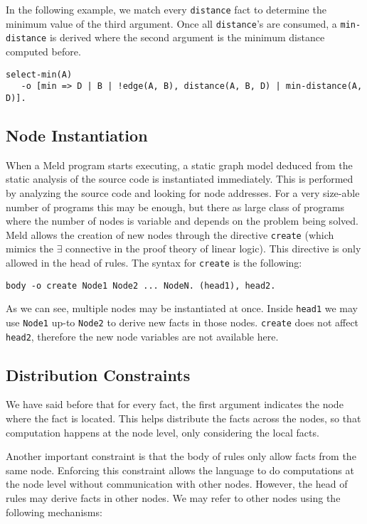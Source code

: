 \documentclass[11pt]{article}
\begin{document}
In the following example, we match every \texttt{distance} fact to determine the minimum value of the third argument. Once all \texttt{distance}'s are consumed, a \texttt{min-distance} is derived where the second argument is the minimum distance computed before.

\begin{verbatim}
select-min(A)
   -o [min => D | B | !edge(A, B), distance(A, B, D) | min-distance(A, D)].
\end{verbatim}

\subsection{Node Instantiation}

When a Meld program starts executing, a static graph model deduced from the static analysis of the source code is instantiated immediately. This is performed by analyzing the source code and looking for node addresses. For a very size-able number of programs this may be enough, but there as large class of programs where the number of nodes is variable and depends on the problem being solved. Meld allows the creation of new nodes through the directive \texttt{create} (which mimics the $\exists$ connective in the proof theory of linear logic). This directive is only allowed in the head of rules. The syntax for \texttt{create} is the following:

\begin{verbatim}
body -o create Node1 Node2 ... NodeN. (head1), head2.
\end{verbatim}

As we can see, multiple nodes may be instantiated at once. Inside \texttt{head1} we may use \texttt{Node1} up-to \texttt{Node2} to derive new facts in those nodes. \texttt{create} does not affect \texttt{head2}, therefore the new node variables are not available here.

\subsection{Distribution Constraints}

We have said before that for every fact, the first argument indicates the node where the fact is located. This helps distribute the facts across the nodes, so that computation happens at the node level, only considering the local facts.

Another important constraint is that the body of rules only allow facts from the same node. Enforcing this constraint allows the language to do computations at the node level without communication with other nodes. However, the head of rules may derive facts in other nodes. We may refer to other nodes using the following mechanisms:
\end{document}

